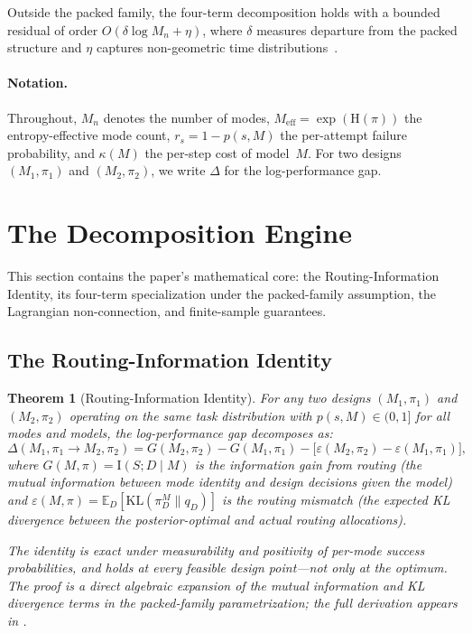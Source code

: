 \documentclass[twoside,11pt]{article}
\newtheorem{theorem}{Theorem}
\newcommand{\KL}{\mathrm{KL}}
\newcommand{\E}{\mathbb{E}}
\newcommand{\Mn}{M_n}
\newcommand{\Meff}{M_{\mathrm{eff}}}
\newcommand{\MI}{\mathrm{I}}
\newcommand{\Hent}{\mathrm{H}}
\newcommand{\mismatch}{\varepsilon}
\begin{document}
Outside the packed family, the four-term decomposition holds with a bounded residual of order $O(\delta \log \Mn + \eta)$, where $\delta$ measures departure from the packed structure and $\eta$ captures non-geometric time distributions~\citep{beneventano2026framework}.

\paragraph{Notation.}
Throughout, $\Mn$ denotes the number of modes, $\Meff = \exp(\Hent(\pi))$ the entropy-effective mode count, $r_s = 1 - p(s, M)$ the per-attempt failure probability, and $\kappa(M)$ the per-step cost of model~$M$.
For two designs $(M_1, \pi_1)$ and $(M_2, \pi_2)$, we write $\Delta$ for the log-performance gap.

\section{The Decomposition Engine}
\label{sec:decomposition}

This section contains the paper's mathematical core: the Routing-Information Identity, its four-term specialization under the packed-family assumption, the Lagrangian non-connection, and finite-sample guarantees.

\subsection{The Routing-Information Identity}
\label{sec:ri-identity}

\begin{theorem}[Routing-Information Identity]
\label{thm:ri-identity}
For any two designs $(M_1, \pi_1)$ and $(M_2, \pi_2)$ operating on the same task distribution with $p(s,M) \in (0,1]$ for all modes and models, the log-performance gap decomposes as:
\begin{equation}
\label{eq:ri-identity}
  \Delta(M_1, \pi_1 \to M_2, \pi_2) = G(M_2, \pi_2) - G(M_1, \pi_1)
  - \bigl[\mismatch(M_2, \pi_2) - \mismatch(M_1, \pi_1)\bigr],
\end{equation}
where $G(M, \pi) = \MI(S; D \mid M)$ is the information gain from routing (the mutual information between mode identity and design decisions given the model) and $\mismatch(M, \pi) = \E_D[\KL(\pi_D^M \| q_D)]$ is the routing mismatch (the expected KL divergence between the posterior-optimal and actual routing allocations).

The identity is exact under measurability and positivity of per-mode success probabilities, and holds at every feasible design point---not only at the optimum.
The proof is a direct algebraic expansion of the mutual information and KL divergence terms in the packed-family parametrization; the full derivation appears in \citet{beneventano2026framework}.
\end{theorem}
\end{document}
